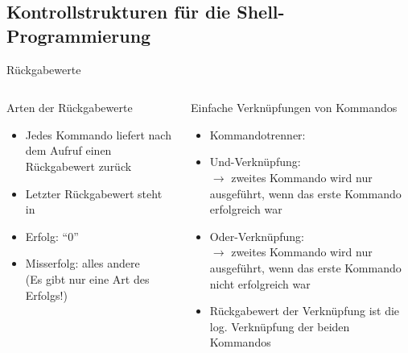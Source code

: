 \documentclass[aspectratio=43]{beamer}
\begin{document}
\subsection{Kontrollstrukturen für die Shell-Programmierung}
\begin{frame}{Rückgabewerte}
  \begin{columns}
    \begin{column}{0.4\textwidth}
      \begin{block}{Arten der Rückgabewerte}
        \begin{itemize}
          \item Jedes Kommando liefert nach dem Aufruf einen Rückgabewert zurück
          \item Letzter Rückgabewert steht in 
          \item Erfolg: "`0"'
          \item Misserfolg: alles andere\\
               (Es gibt nur eine Art des Erfolgs!)
        \end{itemize}
      \end{block}
    \end{column}
    \begin{column}{0.7\textwidth}
       \begin{block}{Einfache Verknüpfungen von Kommandos}
            \begin{itemize}
              \item Kommandotrenner: \co{;}
              \item Und-Verknüpfung: \co{\&\&}\\
                    $\rightarrow$ zweites Kommando wird nur ausgeführt, wenn das erste Kommando
                    erfolgreich war
              \item Oder-Verknüpfung: \co{||}\\
                    $\rightarrow$ zweites Kommando wird nur ausgeführt, wenn das erste Kommando
                    nicht erfolgreich war
              \item Rückgabewert der Verknüpfung ist die log. Verknüpfung der beiden Kommandos
            \end{itemize}
        \end{block}
    \end{column}
  \end{columns}
\end{frame}
\end{document}
